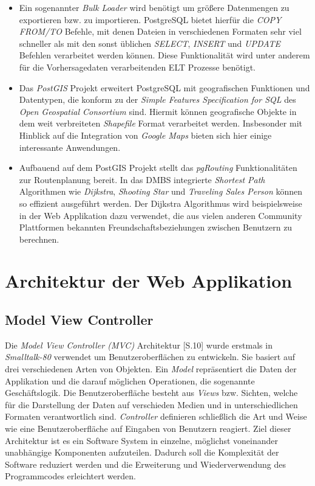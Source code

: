 \begin{itemize}
\item Ein sogenannter \textit{Bulk Loader} wird benötigt um größere
  Datenmengen zu exportieren bzw. zu importieren. PostgreSQL bietet
  hierfür die \textit{COPY FROM/TO} Befehle, mit denen Dateien in
  verschiedenen Formaten sehr viel schneller als mit den sonst
  üblichen \textit{SELECT}, \textit{INSERT} und \textit{UPDATE}
  Befehlen verarbeitet werden können. Diese Funktionalität wird unter
  anderem für die Vorhersagedaten verarbeitenden ELT Prozesse
  benötigt.

\item Das \textit{PostGIS} Projekt erweitert PostgreSQL mit
  geografischen Funktionen und Datentypen, die konform zu der
  \textit{Simple Features Specification for SQL} des \textit{Open
    Geospatial Consortium} sind. Hiermit können geografische Objekte
  in dem weit verbreiteten \textit{Shapefile} Format verarbeitet
  werden. Insbesonder mit Hinblick auf die Integration von
  \textit{Google Maps} bieten sich hier einige interessante
  Anwendungen.

\item Aufbauend auf dem PostGIS Projekt stellt das \textit{pgRouting}
  Funktionalitäten zur Routenplanung bereit. In das DMBS integrierte
  \textit{Shortest Path} Algorithmen wie \textit{Dijkstra},
  \textit{Shooting Star} und \textit{Traveling Sales Person} können so
  effizient ausgeführt werden. Der Dijkstra Algorithmus wird
  beispielsweise in der Web Applikation dazu verwendet, die aus vielen
  anderen Community Plattformen bekannten Freundschaftsbeziehungen
  zwischen Benutzern zu berechnen.

\end{itemize}

\section{Architektur der Web Applikation}

\subsection{Model View Controller}
\label{Model View Controller}

Die \textit{Model View Controller (MVC)} Architektur
\cite{Gamma95Design}[S.10] wurde erstmals in \textit{Smalltalk-80}
verwendet um Benutzeroberflächen zu entwickeln. Sie basiert auf drei
verschiedenen Arten von Objekten. Ein \textit{Model} repräsentiert die
Daten der Applikation und die darauf möglichen Operationen, die
sogenannte Geschäftslogik. Die Benutzeroberfläche besteht aus
\textit{Views} bzw. Sichten, welche für die Darstellung der Daten auf
verschieden Medien und in unterschiedlichen Formaten verantwortlich
sind. \textit{Controller} definieren schließlich die Art und Weise wie
eine Benutzeroberfläche auf Eingaben von Benutzern reagiert. Ziel
dieser Architektur ist es ein Software System in einzelne, möglichst
voneinander unabhängige Komponenten aufzuteilen. Dadurch soll die
Komplexität der Software reduziert werden und die Erweiterung und
Wiederverwendung des Programmcodes erleichtert werden.


